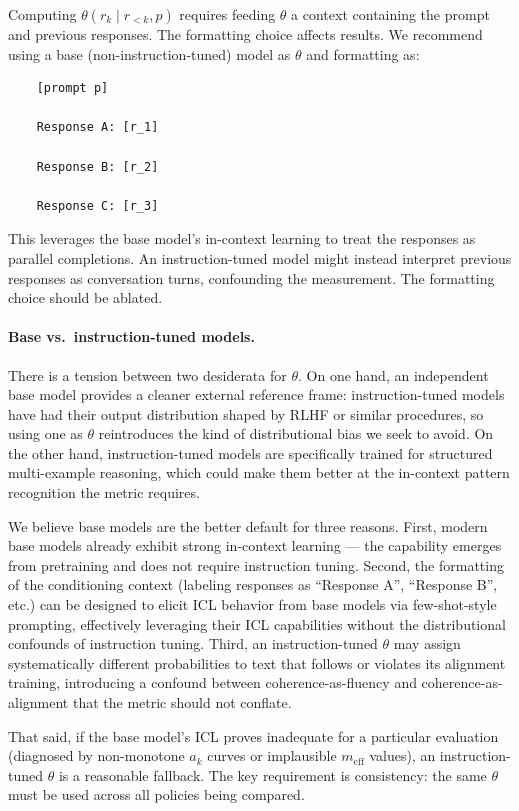 \documentclass[11pt]{article}
\begin{document}
Computing $\theta(r_k \mid r_{<k}, p)$ requires feeding $\theta$ a context containing the prompt and previous responses. The formatting choice affects results. We recommend using a base (non-instruction-tuned) model as $\theta$ and formatting as:

\begin{verbatim}
    [prompt p]

    Response A: [r_1]

    Response B: [r_2]

    Response C: [r_3]
\end{verbatim}

This leverages the base model's in-context learning to treat the responses as parallel completions. An instruction-tuned model might instead interpret previous responses as conversation turns, confounding the measurement. The formatting choice should be ablated.

\paragraph{Base vs.\ instruction-tuned models.} There is a tension between two desiderata for $\theta$. On one hand, an independent base model provides a cleaner external reference frame: instruction-tuned models have had their output distribution shaped by RLHF or similar procedures, so using one as $\theta$ reintroduces the kind of distributional bias we seek to avoid. On the other hand, instruction-tuned models are specifically trained for structured multi-example reasoning, which could make them better at the in-context pattern recognition the metric requires.

We believe base models are the better default for three reasons. First, modern base models already exhibit strong in-context learning --- the capability emerges from pretraining and does not require instruction tuning. Second, the formatting of the conditioning context (labeling responses as ``Response A'', ``Response B'', etc.) can be designed to elicit ICL behavior from base models via few-shot-style prompting, effectively leveraging their ICL capabilities without the distributional confounds of instruction tuning. Third, an instruction-tuned $\theta$ may assign systematically different probabilities to text that follows or violates its alignment training, introducing a confound between coherence-as-fluency and coherence-as-alignment that the metric should not conflate.

That said, if the base model's ICL proves inadequate for a particular evaluation (diagnosed by non-monotone $a_k$ curves or implausible $m_{\mathrm{eff}}$ values), an instruction-tuned $\theta$ is a reasonable fallback. The key requirement is consistency: the same $\theta$ must be used across all policies being compared.
\end{document}

